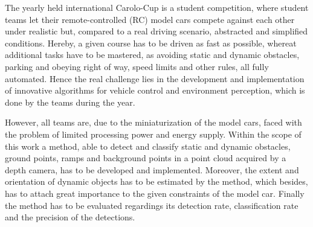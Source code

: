 The yearly held international Carolo-Cup is a student competition, where student teams let their remote-controlled (RC) model cars compete against each other under realistic but, compared to a real driving scenario, abstracted and simplified conditions. Hereby, a given course has to be driven as fast as possible, whereat additional tasks have to be mastered, as avoiding static and dynamic obstacles, parking and obeying right of way, speed limits and other rules, all fully automated. Hence the real challenge lies in the development and implementation of innovative algorithms for vehicle control and environment perception, which is done by the teams during the year.

However, all teams are, due to the miniaturization of the model cars, faced with the problem of limited processing power and energy supply. Within the scope of this work a method, able to detect and classify static and dynamic obstacles, ground points, ramps and background points in a point cloud acquired by a depth camera, has to be developed and implemented. Moreover, the extent and orientation of dynamic objects has to be estimated by the method, which besides, has to attach great importance to the given constraints of the model car. Finally the method has to be evaluated regardings its detection rate, classification rate and the precision of the detections.